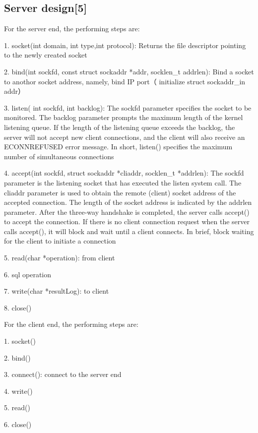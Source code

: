 \documentclass[UTF8, 11pt, twocolumn]{ctexart}
\begin{document}
        \subsection{Server design[5]}
            For the server end, the performing steps are: \par
            1. socket(int domain, int type,int protocol): Returns the file descriptor pointing to the newly created socket \par
            2. bind(int sockfd, const struct sockaddr *addr, socklen_t addrlen): Bind a socket to anothor socket address, namely, bind IP port（
            initialize struct sockaddr_in addr）\par
            3. listen( int sockfd, int backlog): The sockfd parameter specifies the socket to be monitored. The backlog parameter prompts the maximum length of the kernel 
            listening queue. If the length of the listening queue exceeds the backlog, the server will not accept new client connections, and the 
            client will also receive an ECONNREFUSED error message. In short, listen() specifies the maximum number of simultaneous connections \par
            4. accept(int sockfd, struct sockaddr *cliaddr, socklen_t *addrlen): The sockfd parameter is the listening socket that has executed the listen system call. The cliaddr parameter is used to 
            obtain the remote (client) socket address of the accepted connection. The length of the socket address is indicated by the addrlen 
            parameter. After the three-way handshake is completed, the server calls accept() to accept the connection. If there is no client 
            connection request when the server calls accept(), it will block and wait until a client connects. In brief, block waiting for the client to 
            initiate a connection \par
            5. read(char *operation): from client \par
            6. sql operation \par
            7. write(char *resultLog): to client \par
            8. close() \par
            For the client end, the performing steps are: \par
            1. socket() \par
            2. bind() \par
            3. connect(): connect to the server end \par
            4. write() \par
            5. read() \par
            6. close() \par
\end{document}
